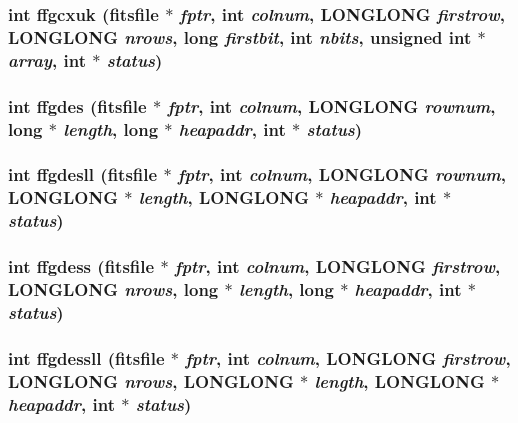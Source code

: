 \subsubsection{\setlength{\rightskip}{0pt plus 5cm}int ffgcxuk (\bf{fitsfile} $\ast$ {\em fptr}, int {\em colnum}, \bf{LONGLONG} {\em firstrow}, \bf{LONGLONG} {\em nrows}, long {\em firstbit}, int {\em nbits}, unsigned int $\ast$ {\em array}, int $\ast$ {\em status})}\label{fitsio_8h_93518bd3d82829c1560b2414280b97c2}


\subsubsection{\setlength{\rightskip}{0pt plus 5cm}int ffgdes (\bf{fitsfile} $\ast$ {\em fptr}, int {\em colnum}, \bf{LONGLONG} {\em rownum}, long $\ast$ {\em length}, long $\ast$ {\em heapaddr}, int $\ast$ {\em status})}\label{fitsio_8h_c66d84a807557a2d7aa8f1a3b3012100}


\subsubsection{\setlength{\rightskip}{0pt plus 5cm}int ffgdesll (\bf{fitsfile} $\ast$ {\em fptr}, int {\em colnum}, \bf{LONGLONG} {\em rownum}, \bf{LONGLONG} $\ast$ {\em length}, \bf{LONGLONG} $\ast$ {\em heapaddr}, int $\ast$ {\em status})}\label{fitsio_8h_3d39c62a134b069e27cc44a8a51f8536}


\subsubsection{\setlength{\rightskip}{0pt plus 5cm}int ffgdess (\bf{fitsfile} $\ast$ {\em fptr}, int {\em colnum}, \bf{LONGLONG} {\em firstrow}, \bf{LONGLONG} {\em nrows}, long $\ast$ {\em length}, long $\ast$ {\em heapaddr}, int $\ast$ {\em status})}\label{fitsio_8h_7d0b7c25bc1bd32b8f115343aa4abb93}


\subsubsection{\setlength{\rightskip}{0pt plus 5cm}int ffgdessll (\bf{fitsfile} $\ast$ {\em fptr}, int {\em colnum}, \bf{LONGLONG} {\em firstrow}, \bf{LONGLONG} {\em nrows}, \bf{LONGLONG} $\ast$ {\em length}, \bf{LONGLONG} $\ast$ {\em heapaddr}, int $\ast$ {\em status})}\label{fitsio_8h_9d2a8b64f329ddcc261edfacabb4861f}


